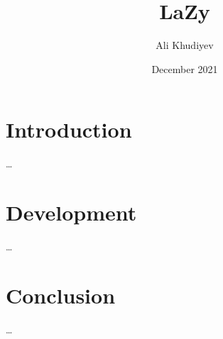 \documentclass[a4paper]{article}
\title{LaZy}
\author{Ali Khudiyev}
\date{December 2021}
\begin{document}
\maketitle

\section{Introduction}
\ldots

\section{Development}
\ldots

\section{Conclusion}
\ldots
\end{document}

